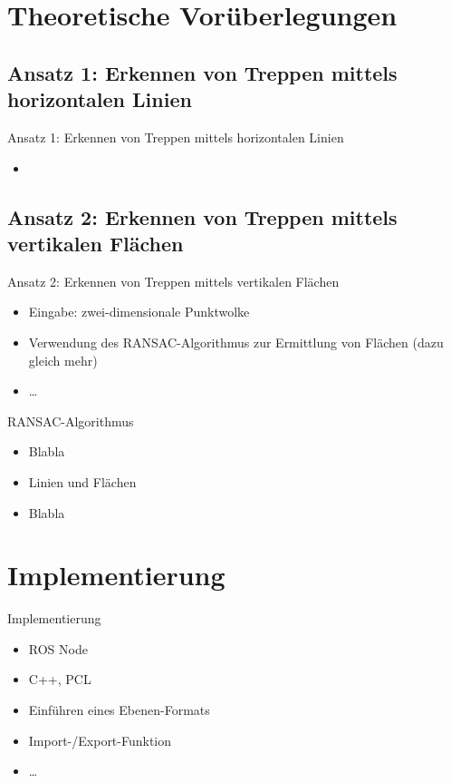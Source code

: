 \documentclass[18pt]{beamer}
\begin{document}
\section{Theoretische Vorüberlegungen}

\subsection{Ansatz 1: Erkennen von Treppen mittels horizontalen Linien}
\begin{frame}{Ansatz 1: Erkennen von Treppen mittels horizontalen Linien}
	\begin{itemize}
		\item
	\end{itemize}
\end{frame}


\subsection{Ansatz 2: Erkennen von Treppen mittels vertikalen Flächen}
\begin{frame}{Ansatz 2: Erkennen von Treppen mittels vertikalen Flächen}
	\begin{itemize}
		\item Eingabe: zwei-dimensionale Punktwolke
		\item Verwendung des RANSAC-Algorithmus zur Ermittlung von Flächen (dazu gleich mehr)
		\item \dots
	\end{itemize}
\end{frame}

\begin{frame}{RANSAC-Algorithmus}
	\begin{itemize}
		\item Blabla
		\item Linien und Flächen
		\item Blabla
	\end{itemize}
\end{frame}



\section{Implementierung}

\begin{frame}{Implementierung}
	\begin{itemize}
		\item ROS Node
		\item C++, PCL
		\item Einführen eines Ebenen-Formats
		\item Import-/Export-Funktion
		\item \dots
	\end{itemize}
\end{frame}
\end{document}
